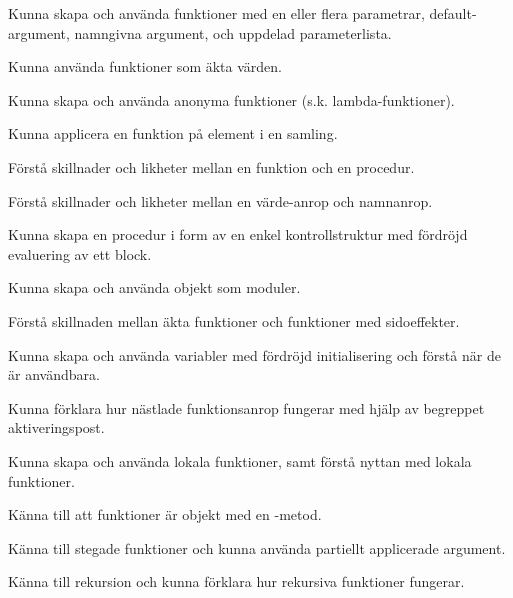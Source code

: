 
\item Kunna skapa och använda funktioner med en eller flera parametrar, default-argument, namngivna argument, och uppdelad parameterlista.
\item Kunna använda funktioner som äkta värden. 
\item Kunna skapa och använda anonyma funktioner (s.k. lambda-funktioner).
\item Kunna applicera en funktion på element i en samling.
\item Förstå skillnader och likheter mellan en funktion och en procedur.
\item Förstå skillnader och likheter mellan en värde-anrop och namnanrop.
\item Kunna skapa en procedur i form av en enkel kontrollstruktur med fördröjd evaluering av ett block.
\item Kunna skapa och använda objekt som moduler.
\item Förstå skillnaden mellan äkta funktioner och funktioner med sidoeffekter.
\item Kunna skapa och använda variabler med fördröjd initialisering och förstå när de är användbara.
\item Kunna förklara hur nästlade funktionsanrop fungerar med hjälp av begreppet aktiveringspost.
\item Kunna skapa och använda lokala funktioner, samt förstå nyttan med lokala funktioner.
\item Känna till att funktioner är objekt med en -metod.
\item Känna till stegade funktioner och kunna använda partiellt applicerade argument. 
\item Känna till rekursion och kunna förklara hur rekursiva funktioner fungerar.
